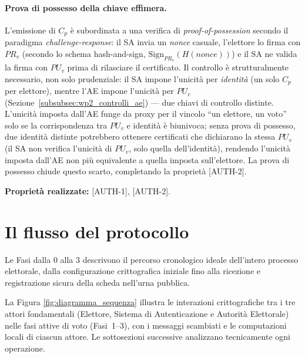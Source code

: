 \paragraph{Prova di possesso della chiave effimera.} L'emissione di $C_p$ è subordinata a una verifica di \textit{proof-of-possession} secondo il paradigma \textit{challenge-response}: il SA invia un \textit{nonce} casuale, l'elettore lo firma con $PR_v$ (secondo lo schema hash-and-sign, $\mathrm{Sign}_{PR_v}(H(\mathit{nonce}))$) e il SA ne valida la firma con $PU_v$ prima di rilasciare il certificato. Il controllo è strutturalmente necessario, non solo prudenziale: il SA impone l'unicità per \textit{identità} (un solo $C_p$ per elettore), mentre l'AE impone l'unicità per $PU_v$ (Sezione~\ref{subsubsec:wp2_controlli_ae}) --- due chiavi di controllo distinte. L'unicità imposta dall'AE funge da proxy per il vincolo ``un elettore, un voto'' solo se la corrispondenza tra $PU_v$ e identità è biunivoca; senza prova di possesso, due identità distinte potrebbero ottenere certificati che dichiarano la stessa $PU_v$ (il SA non verifica l'unicità di $PU_v$, solo quella dell'identità), rendendo l'unicità imposta dall'AE non più equivalente a quella imposta sull'elettore. La prova di possesso chiude questo scarto, completando la proprietà [AUTH-2].

\noindent\textbf{Proprietà realizzate:} [AUTH-1], [AUTH-2].

\section{Il flusso del protocollo}
\label{sec:flusso_protocollo}

Le Fasi dalla 0 alla 3 descrivono il percorso cronologico ideale dell'intero processo elettorale, dalla configurazione crittografica iniziale fino alla ricezione e registrazione sicura della scheda nell'urna pubblica. 

La Figura \ref{fig:diagramma_sequenza} illustra le interazioni crittografiche tra i tre attori fondamentali (Elettore, Sistema di Autenticazione e Autorità Elettorale) nelle fasi attive di voto (Fasi~1--3), con i messaggi scambiati e le computazioni locali di ciascun attore. Le sottosezioni successive analizzano tecnicamente ogni operazione.

